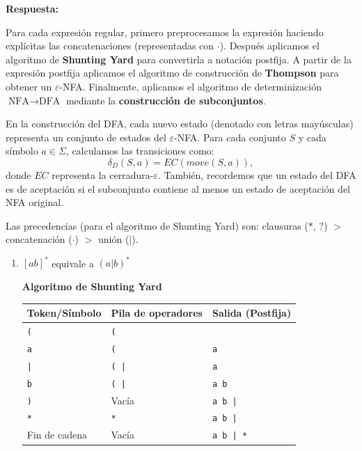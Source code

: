 \documentclass[12pt, letterpaper]{article}
\begin{document}
\begin{enumerate}
    \textbf{Respuesta:}

    Para cada expresión regular, primero preprocesamos la expresión haciendo
    explícitas las concatenaciones (representadas con $\cdot$). Después
    aplicamos el algoritmo de \textbf{Shunting Yard} para convertirla a notación
    postfija. A partir de la expresión postfija aplicamos el algoritmo de
    construcción de \textbf{Thompson} para obtener un $\varepsilon$-NFA.
    Finalmente, aplicamos el algoritmo de determinización
    $\text{NFA}\rightarrow\text{DFA}$ mediante la \textbf{construcción de subconjuntos}.

    En la construcción del DFA, cada nuevo estado (denotado con letras mayúsculas) 
    representa un conjunto de estados del $\varepsilon$-NFA. Para cada conjunto $S$ y 
    cada símbolo $a\in\Sigma$, calculamos las transiciones como:
    \[
    \delta_D(S,a)=EC(move(S,a)),
    \]
    donde $EC$ representa la cerradura-$\varepsilon$. 
    También, recordemos que un estado del DFA es de aceptación si el subconjunto contiene al menos un estado de 
    aceptación del NFA original.

    Las precedencias (para el algoritmo de Shunting Yard) son:
    clausuras ($*$, $?$) $>$ concatenación ($\cdot$) $>$ unión ($|$).

    \begin{enumerate}


    \item $[ab]^*$ equivale a $(a|b)^*$

      \textbf{Algoritmo de Shunting Yard}

      \begin{center}
        \small
        \begin{tabular}{lll}
          \toprule
          \textbf{Token/Símbolo} & \textbf{Pila de operadores} & \textbf{Salida (Postfija)} \\
          \midrule
          \texttt{(} & \texttt{(} & \\
          \texttt{a} & \texttt{(} & \texttt{a} \\
          \texttt{|} & \texttt{( |} & \texttt{a} \\
          \texttt{b} & \texttt{( |} & \texttt{a b} \\
          \texttt{)} & Vacía & \texttt{a b |} \\
          \texttt{*} & \texttt{*} & \texttt{a b |} \\
          Fin de cadena & Vacía & \texttt{a b | *} \\
          \bottomrule
        \end{tabular}
      \end{center}


\end{enumerate}
\end{enumerate}
\end{document}

